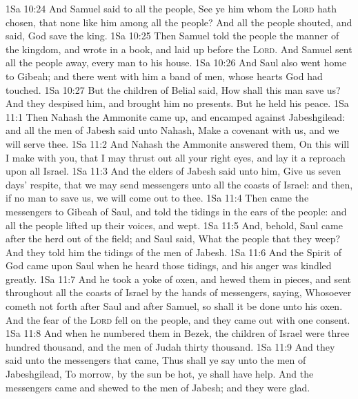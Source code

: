 \vs 1Sa 10:24 And Samuel said to all the people, See ye him whom the \textsc{Lord} hath chosen, that  none like him among all the people? And all the people shouted, and said, God save the king.
\vs 1Sa 10:25 Then Samuel told the people the manner of the kingdom, and wrote  in a book, and laid  up before the \textsc{Lord}. And Samuel sent all the people away, every man to his house.
\vs 1Sa 10:26 And Saul also went home to Gibeah; and there went with him a band of men, whose hearts God had touched.
\vs 1Sa 10:27 But the children of Belial said, How shall this man save us? And they despised him, and brought him no presents. But he held his peace.
\vs 1Sa 11:1 Then Nahash the Ammonite came up, and encamped against Jabeshgilead: and all the men of Jabesh said unto Nahash, Make a covenant with us, and we will serve thee.
\vs 1Sa 11:2 And Nahash the Ammonite answered them, On this  will I make  with you, that I may thrust out all your right eyes, and lay it  a reproach upon all Israel.
\vs 1Sa 11:3 And the elders of Jabesh said unto him, Give us seven days' respite, that we may send messengers unto all the coasts of Israel: and then, if  no man to save us, we will come out to thee.
\vs 1Sa 11:4 Then came the messengers to Gibeah of Saul, and told the tidings in the ears of the people: and all the people lifted up their voices, and wept.
\vs 1Sa 11:5 And, behold, Saul came after the herd out of the field; and Saul said, What  the people that they weep? And they told him the tidings of the men of Jabesh.
\vs 1Sa 11:6 And the Spirit of God came upon Saul when he heard those tidings, and his anger was kindled greatly.
\vs 1Sa 11:7 And he took a yoke of oxen, and hewed them in pieces, and sent  throughout all the coasts of Israel by the hands of messengers, saying, Whosoever cometh not forth after Saul and after Samuel, so shall it be done unto his oxen. And the fear of the \textsc{Lord} fell on the people, and they came out with one consent.
\vs 1Sa 11:8 And when he numbered them in Bezek, the children of Israel were three hundred thousand, and the men of Judah thirty thousand.
\vs 1Sa 11:9 And they said unto the messengers that came, Thus shall ye say unto the men of Jabeshgilead, To morrow, by  the sun be hot, ye shall have help. And the messengers came and shewed  to the men of Jabesh; and they were glad.
